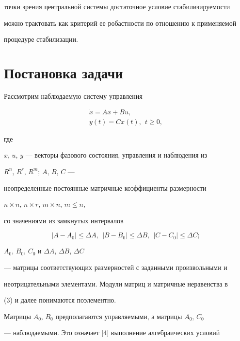 точки зрения центральной системы достаточное условие стабилизируемости


можно трактовать как критерий ее робастности по отношению к применяемой


процедуре стабилизации.





\section{Постановка задачи}





Рассмотрим наблюдаемую систему управления


\begin{gather}


\Dot x = Ax+Bu, \\


y(t)=Cx(t), \ \ t \ge 0,


\end{gather}


где


$x$, $u$, $y$ --- векторы фазового состояния, управления и наблюдения из


$R^n$, $R^r$, $R^m$; $A$, $B$, $C$ ---


неопределенные постоянные матричные коэффициенты размерности


$n \times n$, $n \times r$, $m \times n$, $m \le n$,


со значениями из замкнутых интервалов


\begin{equation}


|A-A_0| \le \Delta A, \ \ |B-B_0| \le \Delta B, \ \ |C-C_0| \le \Delta C;


\end{equation}


$A_0$, $B_0$, $C_0$ и $\Delta A$, $\Delta B$, $\Delta C$


--- матрицы соответствующих размерностей с заданными произвольными и


неотрицательными элементами. Модули матриц и матричные неравенства в


(3) и далее понимаются поэлементно.





Матрицы $A_0$, $B_0$ предполагаются управляемыми, а матрицы $A_0$, $C_0$


--- наблюдаемыми. Это означает [4] выполнение алгебраических условий


